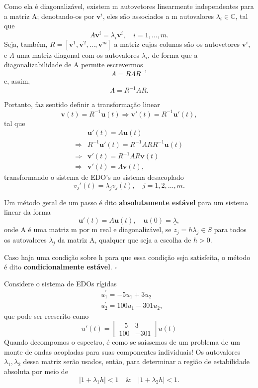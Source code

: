 \documentclass[../differential_methods.tex]{subfiles}
\begin{document}
Como ela é diagonalizável, existem m autovetores linearmente independentes para a matriz A; denotando-os por \(\mathbf{v}^{i}\), eles são associados a m autovalores \(\lambda_{i}\in \mathbb{C}\), tal que
\[
	A \mathbf{v}^{i} = \lambda_{i}\mathbf{v}^{i}, \quad i=1, \dotsc , m.
\]
Seja, também, \(R = [\mathbf{v}^{1}, \mathbf{v}^{2}, \dotsc , \mathbf{v}^{m}]\) a matriz cujas colunas são os autovetores \(\mathbf{v}^{i}\), e \(\Lambda \) uma matriz diagonal com os autovalores \(\lambda_{i}\), de forma que a diagonalizabilidade de A permite escrevermos
\[
	A = R \Lambda R^{-1}
\]
e, assim,
\[
	\Lambda  = R^{-1}AR.
\]

Portanto, faz sentido definir a transformação linear
\[
	\mathbf{v}(t) = R^{-1}\mathbf{u}(t) \Rightarrow \mathbf{v}'(t)=R^{-1}\mathbf{u}'(t),
\]
tal que
\begin{align*}
	            & \mathbf{u}'(t) = A \mathbf{u}(t)                    \\
	\Rightarrow & R^{-1}\mathbf{u}'(t) = R^{-1}ARR^{-1} \mathbf{u}(t) \\
	\Rightarrow & \mathbf{v}'(t) = R^{-1}AR \mathbf{v}(t)             \\
	\Rightarrow & \mathbf{v}'(t) = \Lambda \mathbf{v}(t),
\end{align*}
transformando o sistema de EDO's no sistema desacoplado
\[
	v_{j}'(t) = \lambda_{j} v_{j}(t), \quad j=1, 2, \dotsc , m.
\]
\begin{def*}
	Um método geral de um passo é dito \textbf{absolutamente estável} para um sistema linear da forma
	\[
		\mathbf{u}'(t) = A \mathbf{u}(t), \quad \mathbf{u}(0) = \underline{\lambda },
	\]
	onde A é uma matriz m por m real e diagonalizável, se \(z_{j} = h\lambda_{j}\in S\) para todos os autovalores \(\lambda_{j}\) da matriz A, qualquer que seja a escolha de \(h > 0.\)

	Caso haja uma condição sobre h para que essa condição seja satisfeita, o método é dito \textbf{condicionalmente estável}. \(\square\)
\end{def*}
\begin{example}
	Considere o sistema de EDOs rígidas
	\begin{align*}
		 & u_{1}^{'} = -5u_1 + 3u_2     \\
		 & u_{2}^{'} = 100u_1 - 301u_2,
	\end{align*}
	que pode ser reescrito como
	\[
		u'(t) = \begin{bmatrix}
			-5  & 3    \\
			100 & -301
		\end{bmatrix} u(t)
	\]
	Quando decompomos o espectro, é como se saíssemos de um problema de um monte de ondas acopladas para suas componentes individuais! Os autovalores \(\lambda_1, \lambda_2\) dessa matriz serão usados, então, para determinar a região de estabilidade absoluta por meio de
	\[
		| 1+\lambda_1 h | < 1 \quad\&\quad | 1+ \lambda_2 h | < 1.
	\]
\end{example}
\end{document}
